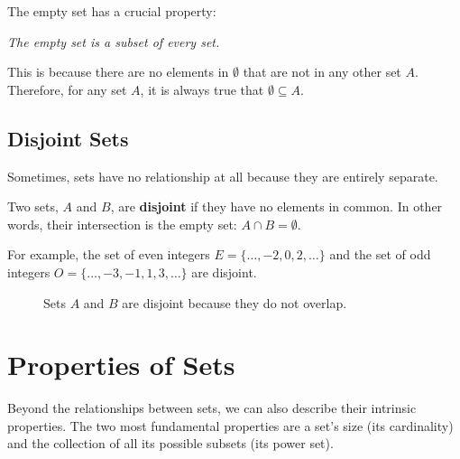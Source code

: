 The empty set has a crucial property:
\begin{center}
    \textit{The empty set is a subset of every set.}
\end{center}
This is because there are no elements in $\emptyset$ that are not in any other set $A$. Therefore, for any set $A$, it is always true that $\emptyset \subseteq A$.

\subsection*{Disjoint Sets}
Sometimes, sets have no relationship at all because they are entirely separate.

\begin{definition}
    Two sets, $A$ and $B$, are \textbf{disjoint} if they have no elements in common. In other words, their intersection is the empty set: $A \cap B = \emptyset$.
\end{definition}

For example, the set of even integers $E = \{\dots, -2, 0, 2, \dots\}$ and the set of odd integers $O = \{\dots, -3, -1, 1, 3, \dots\}$ are disjoint.

\begin{figure}[htbp]
    \centering
    \caption{Sets $A$ and $B$ are disjoint because they do not overlap.}
    \label{fig:disjoint_sets}
\end{figure}

\section{Properties of Sets}
Beyond the relationships between sets, we can also describe their intrinsic properties. The two most fundamental properties are a set's size (its cardinality) and the collection of all its possible subsets (its power set).

